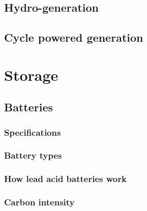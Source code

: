 \documentclass{article}
\theoremstyle{definition}
\theoremstyle{definition}
\theoremstyle{remark}
\begin{document}

  \subsection{Hydro-generation} %
  \label{sub:hydro_generation}
  

  \subsection{Cycle powered generation} %
  \label{sub:cycle_powered_generation}
  


\section{Storage} %
\label{sec:storage}

  \subsection{Batteries} %
  \label{sub:batteries}
  
    \subsubsection{Specifications} %
    \label{ssub:specifications}
    

    \subsubsection{Battery types} %
    \label{ssub:battery_types}
    

    \subsubsection{How lead acid batteries work} %
    \label{ssub:how_lead_acid_batteries_work}
    

    \subsubsection{Carbon intensity} %
    \label{ssub:carbon_intensity}
    
\end{document}
